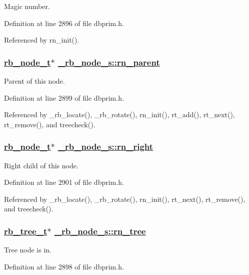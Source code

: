 Magic number. 

Definition at line 2896 of file dbprim.h.

Referenced by rn\_\-init().\hypertarget{struct__rb__node__s_o3}{
\subsubsection[rn\_\-parent]{\setlength{\rightskip}{0pt plus 5cm}\hyperlink{struct__rb__node__s}{rb\_\-node\_\-t}$\ast$ \hyperlink{struct__rb__node__s_o3}{\_\-rb\_\-node\_\-s::rn\_\-parent}}}
\label{struct__rb__node__s_o3}


Parent of this node. 

Definition at line 2899 of file dbprim.h.

Referenced by \_\-rb\_\-locate(), \_\-rb\_\-rotate(), rn\_\-init(), rt\_\-add(), rt\_\-next(), rt\_\-remove(), and treecheck().\hypertarget{struct__rb__node__s_o5}{
\subsubsection[rn\_\-right]{\setlength{\rightskip}{0pt plus 5cm}\hyperlink{struct__rb__node__s}{rb\_\-node\_\-t}$\ast$ \hyperlink{struct__rb__node__s_o5}{\_\-rb\_\-node\_\-s::rn\_\-right}}}
\label{struct__rb__node__s_o5}


Right child of this node. 

Definition at line 2901 of file dbprim.h.

Referenced by \_\-rb\_\-locate(), \_\-rb\_\-rotate(), rn\_\-init(), rt\_\-next(), rt\_\-remove(), and treecheck().\hypertarget{struct__rb__node__s_o2}{
\subsubsection[rn\_\-tree]{\setlength{\rightskip}{0pt plus 5cm}\hyperlink{struct__rb__tree__s}{rb\_\-tree\_\-t}$\ast$ \hyperlink{struct__rb__node__s_o2}{\_\-rb\_\-node\_\-s::rn\_\-tree}}}
\label{struct__rb__node__s_o2}


Tree node is in. 

Definition at line 2898 of file dbprim.h.

